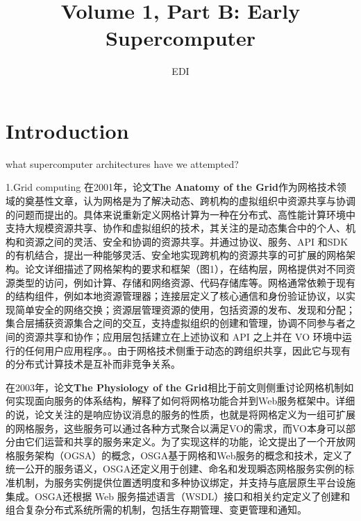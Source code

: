 \documentclass[a4paper,twoside]{scrbook}
\begin{document}
\title{Volume 1, Part B: Early Supercomputer}
\author{EDI}
\frontmatter
\maketitle
\tableofcontents
\mainmatter

\chapter{Introduction}

what supercomputer architectures have we attempted?

1.Grid computing
在2001年，论文\textbf{The Anatomy of the Grid}作为网格技术领域的奠基性文章，认为网格是为了解决动态、跨机构的虚拟组织中资源共享与协调的问题而提出的。具体来说重新定义网格计算为一种在分布式、高性能计算环境中支持大规模资源共享、协作和虚拟组织的技术，其关注的是动态集合中的个人、机构和资源之间的灵活、安全和协调的资源共享。并通过协议、服务、API 和SDK 的有机结合，提出一种能够灵活、安全地实现跨机构的资源共享的可扩展的网格架构。论文详细描述了网格架构的要求和框架（图1），在结构层，网格提供对不同资源类型的访问，例如计算、存储和网络资源、代码存储库等。网格通常依赖于现有的结构组件，例如本地资源管理器；连接层定义了核心通信和身份验证协议，以实现简单安全的网络交换；资源层管理资源的使用，包括资源的发布、发现和分配；集合层捕获资源集合之间的交互，支持虚拟组织的创建和管理，协调不同参与者之间的资源共享和协作；应用层包括建立在上述协议和 API 之上并在 VO 环境中运行的任何用户应用程序。。由于网格技术侧重于动态的跨组织共享，因此它与现有的分布式计算技术是互补而非竞争关系。

在2003年，论文\textbf{The Physiology of the Grid}相比于前文则侧重讨论网格机制如何实现面向服务的体系结构，解释了如何将网格功能合并到Web服务框架中。详细的说，论文关注的是响应协议消息的服务的性质，也就是将网格定义为一组可扩展的网格服务，这些服务可以通过各种方式聚合以满足VO的需求，而VO本身可以部分由它们运营和共享的服务来定义。为了实现这样的功能，论文提出了一个开放网格服务架构（OGSA）的概念，OSGA基于网格和Web服务的概念和技术，定义了统一公开的服务语义，OSGA还定义用于创建、命名和发现瞬态网格服务实例的标准机制，为服务实例提供位置透明度和多种协议绑定，并支持与底层原生平台设施集成。OSGA还根据 Web 服务描述语言（WSDL）接口和相关约定定义了创建和组合复杂分布式系统所需的机制，包括生存期管理、变更管理和通知。
\end{document}
